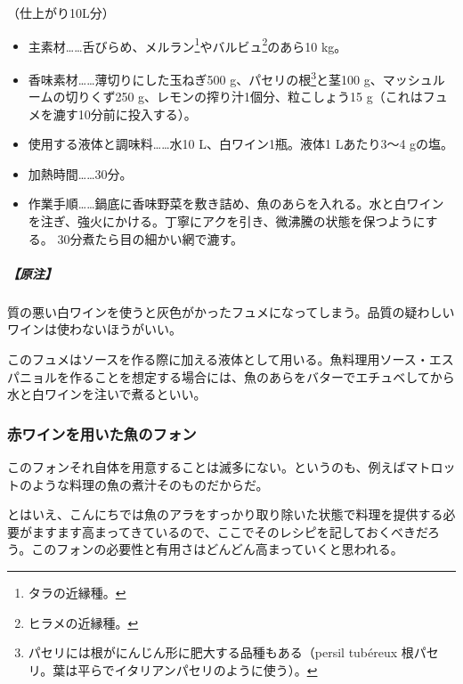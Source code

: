 \begin{recette}
（仕上がり10L分）

\begin{itemize}
\item
  主素材\ldots{}\ldots{}舌びらめ、メルラン\footnote{タラの近縁種。}やバルビュ\footnote{ヒラメの近縁種。}のあら10
  kg。
\item
  香味素材\ldots{}\ldots{}薄切りにした玉ねぎ500 g、パセリの根\footnote{パセリには根がにんじん形に肥大する品種もある（persil
    tubéreux 根パセリ。葉は平らでイタリアンパセリのように使う）。}と茎100
  g、マッシュルームの切りくず250 g、レモンの搾り汁1個分、粒こしょう15
  g（これはフュメを漉す10分前に投入する）。
\item
  使用する液体と調味料\ldots{}\ldots{}水10 L、白ワイン1瓶。液体1
  Lあたり3〜4 gの塩。
\item
  加熱時間\ldots{}\ldots{}30分。
\item
  作業手順\ldots{}\ldots{}鍋底に香味野菜を敷き詰め、魚のあらを入れる。水と白ワインを注ぎ、強火にかける。丁寧にアクを引き、微沸騰の状態を保つようにする。
  30分煮たら目の細かい網で漉す。
\end{itemize}

\hypertarget{nota-fumet-de-poisson}{%
\subparagraph{【原注】}\label{nota-fumet-de-poisson}}

質の悪い白ワインを使うと灰色がかったフュメになってしまう。品質の疑わしいワインは使わないほうがいい。

このフュメはソースを作る際に加える液体として用いる。魚料理用ソース・エスパニョルを作ることを想定する場合には、魚のあらをバターでエチュベしてから水と白ワインを注いで煮るといい。

\hypertarget{fonds-de-poisson-au-vin-rouge}{%
\subsubsection{赤ワインを用いた魚のフォン}\label{fonds-de-poisson-au-vin-rouge}}



このフォンそれ自体を用意することは滅多にない。というのも、例えばマトロットのような料理の魚の煮汁そのものだからだ。

とはいえ、こんにちでは魚のアラをすっかり取り除いた状態で料理を提供する必要がますます高まってきているので、ここでそのレシピを記しておくべきだろう。このフォンの必要性と有用さはどんどん高まっていくと思われる。


\end{recette}
